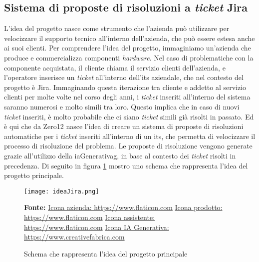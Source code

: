 \subsection{Sistema di proposte di risoluzioni a \textit{ticket} Jira} \label{sec:spiegazioneJira}
L'idea del progetto nasce come strumento che l'azienda può utilizzare per velocizzare il supporto tecnico all'interno dell'azienda, che può essere estesa anche ai suoi clienti. Per comprendere l'idea del progetto, immaginiamo un'azienda che produce e commercializza componenti \textit{hardware}. 
Nel caso di problematiche con la componente acquistata, il cliente chiama il servizio clienti dell'azienda, e l'operatore inserisce un \textit{ticket} all'interno dell'\gls{its} aziendale, che nel contesto del progetto è Jira. Immaginando questa iterazione tra cliente e addetto al servizio clienti per molte volte nel corso degli anni, i \textit{ticket} inseriti all'interno del sistema saranno numerosi e molto simili tra loro. 
Questo implica che in caso di nuovi \textit{ticket} inseriti, è molto probabile che ci siano \textit{ticket} simili già risolti in passato. 
Ed è qui che da Zero12 nasce l'idea di creare un sistema di proposte di risoluzioni automatiche per i \textit{ticket} inseriti all'interno di un \gls{its}, che permetta di velocizzare il processo di risoluzione del problema. Le proposte di risoluzione vengono generate grazie all'utilizzo della \gls{iaGenerativag}, in base al contesto dei \textit{ticket} risolti in precedenza.
Di seguito in figura \ref{fig:ideaJira} mostro uno schema che rappresenta l'idea del progetto principale.

\begin{figure}[H]
    \centering
    \texttt{[image: ideaJira.png]}
    \caption{Schema che rappresenta l'idea del progetto principale}
    \small \textbf{Fonte:} \href{https://www.flaticon.com/free-icon/company_4812244}{Icona azienda: https://www.flaticon.com} \href{https://www.flaticon.com/free-icon/box_4601560}{Icona prodotto: https://www.flaticon.com} \href{https://www.flaticon.com/free-icon/assistant_1442194}{Icona assistente: https://www.flaticon.com} \href{https://www.creativefabrica.com/it/product/ai-brain-outline-icon/} {Icona IA Generativa: https://www.creativefabrica.com}

    \label{fig:ideaJira}
\end{figure}
